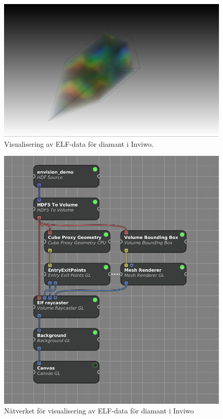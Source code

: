 \documentclass[a4paper,12pt]{article}
\begin{document}
\begin{figure} [H]
\centering
\includegraphics[scale = 0.25]{screenshot_elf_diamant.png}
\caption{Visualisering av ELF-data för diamant i Inviwo.}
\label{fig:screenshot_elf}
\end{figure}

\begin{figure} [H]
\centering
\includegraphics[scale=0.4]{screenshot_elfnatverk_diamant.png}
\caption{Nätverket för visualisering av ELF-data för diamant i Inviwo}
\label{fig:screenshot_elf_network}
\end{figure}
\end{document}
